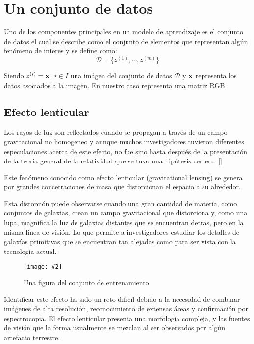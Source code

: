 \documentclass[letterpaper,12pt,oneside]{book}
\newcommand{\figura}[4]{
          \begin{figure}[H]
            \centering
            \texttt{[image: \#2]}
            \caption{#3}
            \label{#4}
          \end{figure}
                            }
\newcommand{\bb}[1]{\{#1\}}
\begin{document}
            \section{Un conjunto de datos}
                Uno de los componentes principales en un modelo de aprendizaje es el conjunto de datos el cual se describe como  el conjunto de elementos que representan algún fenómeno de interes y se define como: 
                    \begin{equation}
                        \label{eq1:dataset}
                        \mathcal{D} = \bb{z^{(1)},\cdots, z^{(m)}}
                    \end{equation} 

                Siendo $z^{(i)} = {\bf x}$, $i \in I$ una imágen del conjunto de datos $\mathcal{D}$ y ${\bf x}$ representa los datos asociados a la imagen. En nuestro caso representa una matriz RGB. 

                    \subsection{Efecto lenticular }


                        Los rayos de luz son reflectados cuando se propagan a través de un campo gravitacional no homogeneo y aunque muchos investigadores tuvieron diferentes especulaciones acerca de este efecto, no fue sino hasta después de la presentación de la teoría general de la relatividad que se tuvo una hipótesis certera. [\cite{bermano2022state}]

                        Este fenómeno conocido como efecto lenticular (gravitational lensing) se genera por grandes concetraciones de masa que distorcionan el espacio a su alrededor. 
                        
                        Esta distorción puede observarse cuando una gran cantidad de materia, como conjuntos de galaxias, crean un campo gravitacional que distorciona y, como una lupa, magnifica la luz de galaxias distantes que se encuentran detras, pero en la misma línea de visión. Lo que permite a investigadores estudiar los detalles de galaxías primitivas que se encuentran tan alejadas como para ser vista con la tecnología actual.

                        \figura{1}{Imagenes/Resultados/space_15.png}{Una figura del conjunto de entrenamiento}{fig:rgb}

                        Identificar este efecto ha sido un reto difícil debido a la necesidad de combinar imágenes de alta resolución, reconocimiento de extensas áreas  y confirmación por espectrocopia. El efecto lenticular presenta una morfología compleja, y las fuentes de visión que la forma usualmente se mezclan al ser observados por algún artefacto terrestre.
\end{document}
